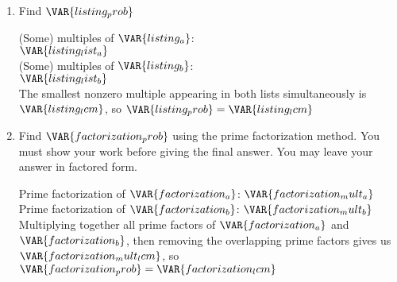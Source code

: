 
\begin{enumerate}

    \item Find $\VAR{listing_prob}$ 

    \vfill

    \begin{ansenv}
        (Some) multiples of $\VAR{listing_a}$:\\
        $\VAR{listing_list_a}$\\

        (Some) multiples of $\VAR{listing_b}$:\\
        $\VAR{listing_list_b}$\\

        The smallest nonzero multiple appearing in both lists simultaneously is $\VAR{listing_lcm}$, so $\VAR{listing_prob} = \VAR{listing_lcm}$
    \end{ansenv}

    \vfill

    \item Find $\VAR{factorization_prob}$ using the prime factorization method. You must show your work before giving the final answer. You may leave your answer in factored form.

    \vfill

    \begin{ansenv}
        Prime factorization of $\VAR{factorization_a}$: $\VAR{factorization_mult_a}$\\

        Prime factorization of $\VAR{factorization_b}$: $\VAR{factorization_mult_b}$\\

        Multiplying together all prime factors of $\VAR{factorization_a}$ and $\VAR{factorization_b}$, then removing the overlapping prime factors gives us $\VAR{factorization_mult_lcm}$, so $\VAR{factorization_prob} = \VAR{factorization_lcm}$
    \end{ansenv}

    \vfill

\end{enumerate}

\trueemptypage